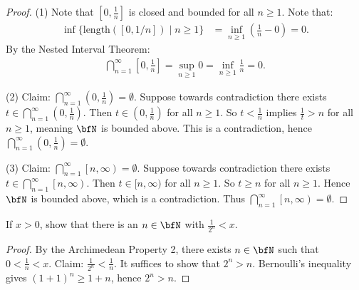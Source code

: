 \documentclass[10pt,twoside,openany]{memoir}
\begin{document}
        {\color{red} \begin{proof}
            (1) Note that $[0,\frac{1}{n}]$ is closed and bounded for all $n \geq 1$. Note that:
                \begin{equation*}
                \begin{split}
                    \inf \{\text{length}\left(\left[0,1/n\right]\right) \mid n \geq 1 \} 
                     &= \inf_{n \geq 1} \left(\frac{1}{n} - 0\right) 
                      = 0.
                \end{split}
                \end{equation*}
            By the Nested Interval Theorem:
                \begin{equation*}
                \begin{split}
                    \bigcap_{n=1}^\infty \left[0 , \frac{1}{n}\right] = \sup_{n \geq 1} 0 = \inf_{n \geq 1} \frac{1}{n} = 0.
                \end{split}
                \end{equation*}

            (2) Claim: $\bigcap_{n=1}^\infty \left(0, \frac{1}{n}\right) = \emptyset$. Suppose towards contradiction there exists $t \in \bigcap_{n=1}^\infty \left(0, \frac{1}{n}\right)$. Then $t \in \left(0 ,\frac{1}{n}\right)$ for all $n \geq 1$. So $t < \frac{1}{n}$ implies $\frac{1}{t} > n$ for all $n\geq 1$, meaning $\bfN$ is bounded above. This is a contradiction, hence $\bigcap_{n=1}^\infty \left(0, \frac{1}{n}\right) = \emptyset$.

            (3) Claim: $\bigcap_{n=1}^\infty \left[n, \infty\right) = \emptyset$. Suppose towards contradiction there exists $t \in \bigcap_{n=1}^\infty \left[n, \infty\right)$. Then $t \in [n,\infty)$ for all $n \geq 1$. So $t \geq n$ for all $n \geq 1$. Hence $\bfN$ is bounded above, which is a contradiction. Thus $\bigcap_{n=1}^\infty \left[n, \infty\right) = \emptyset$.
        \end{proof}}
    \begin{exercise}
        If $x>0$, show that there is an $n \in \bfN$ with $\frac{1}{2^n} <x$.
    \end{exercise}
        {\color{red} \begin{proof}
            By the Archimedean Property 2, there exists $n \in \bfN$ such that $0 < \frac{1}{n} < x$. Claim: $\frac{1}{2^n} < \frac{1}{n}$. It suffices to show that $2^n > n$. Bernoulli's inequality gives $(1+1)^n \geq 1 + n$, hence $2^n > n$.
        \end{proof}}
\end{document}
